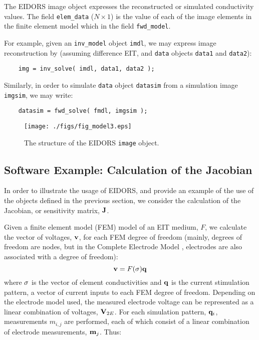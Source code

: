 \documentclass[12pt]{iopart}
\begin{document}
The EIDORS image object expresses the reconstructed or
simulated conductivity values. The field {\tt elem\_data}
($N\times1$) is the value of each of the image elements in 
the finite element model which in the field {\tt fwd\_model}.

For example, given
an {\tt inv\_model} object {\tt imdl}, we may express
image reconstruction by (assuming
difference EIT, and {\tt data} objects {\tt data1} and {\tt data2}):
\begin{verbatim}
    img = inv_solve( imdl, data1, data2 );
\end{verbatim}
Similarly, in order to simulate {\tt data} object {\tt datasim}
from a simulation image {\tt imgsim}, we may write:
\begin{verbatim}
    datasim = fwd_solve( fmdl, imgsim );
\end{verbatim}
%
%
\begin{figure}[th]
\begin{flushright}
\texttt{[image: ./figs/fig\_model3.eps]}
\caption{\small The structure of the EIDORS {\tt image} object.
\label{fig:image}
 }
\end{flushright}
\end{figure}


\subsection{Software Example: Calculation of the Jacobian}

In order to illustrate the usage of EIDORS, and provide
an example of the use of the objects defined in the previous
section, we consider
the calculation of the Jacobian, or sensitivity matrix,
$\bf J$.

Given a finite element model (FEM) model of an EIT medium,
$F$, we calculate the vector of voltages, $\bf v$, 
for each FEM degree of freedom
 (mainly, degrees of freedom are nodes, but in the
 Complete Electrode Model \cite{Cheng_etal_1989},
 electrodes are also associated
 with a degree of freedom):
\begin{equation}
{\bf v} = F({\bf \sigma}){\bf q} 
\end{equation}
where $\bf \sigma$ is the vector of element conductivities
and $\bf q$ is the current stimulation pattern, a vector
of current inputs to each FEM degree of freedom.
Depending on the electrode model used, the measured electrode
voltage can be represented as a linear combination of 
voltages, ${\bf V}_{2E}$.
For each simulation pattern, ${\bf q}_{i}$,
measurements $m_{i,j}$
are performed, each of which consist of a linear combination of
electrode measurements, ${\bf m}_j$.
Thus:
\end{document}
